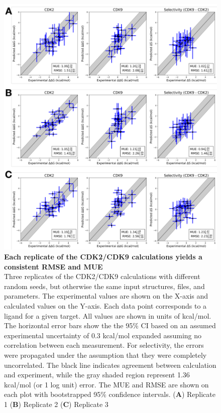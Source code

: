 \documentclass[phd,tocprelim]{cornell}
\begin{document}
\begin{appendices}
	\begin{landscape}
		\begin{figure}[p]
			\centering
			\includegraphics[width=0.46\linewidth]{figures/supp_figure4.pdf}
			\caption[Each replicate of the CDK2/CDK9 calculations yields a consistent RMSE and MUE]{
{\bf Each replicate of the CDK2/CDK9 calculations yields a consistent RMSE and MUE} \\
Three replicates of the CDK2/CDK9 calculations with different random seeds, but otherwise the same input structures, files, and parameters. The experimental values are shown on the X-axis and calculated values on the Y-axis. Each data point corresponds to a ligand for a given target. All values are shown in units of kcal/mol. The horizontal error bars show the the 95\% CI based on an assumed experimental uncertainty of 0.3 kcal/mol\citep{BROWN2009420} expanded assuming no correlation between each measurement. For selectivity, the errors were propagated under the assumption that they were completely uncorrelated. The black line indicates agreement between calculation and experiment, while the gray shaded region represent 1.36 kcal/mol (or 1 log unit) error. The MUE and RMSE are shown on each plot with bootstrapped 95$\%$ confidence intervals. ({\bf A}) Replicate 1 ({\bf B}) Replicate 2 ({\bf C}) Replicate 3}
			\label{fig:sup-figure-4}
		\end{figure}
	\end{landscape}
	

\end{appendices}
\end{document}
